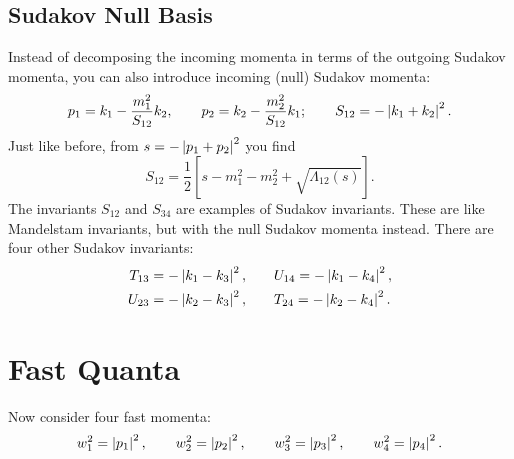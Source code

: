\subsection{Sudakov Null Basis}
Instead of decomposing the incoming momenta in terms of the outgoing Sudakov momenta, you can also introduce incoming (null) Sudakov momenta:
\begin{equation}
	p_{1} = k_{1} - \frac{m_{1}^{2}}{S_{12}} k_{2}, \qquad p_{2} = k_{2} - \frac{m_{2}^{2}}{S_{12}} k_{1}; \qquad S_{12} = -\left\lvert k_{1} + k_{2} \right\rvert^{2}.
\end{equation}
Just like before, from $s = -\left\lvert p_{1} + p_{2} \right\rvert^{2}$ you find
\begin{equation}
	S_{12} = \frac{1}{2} \left[ s - m_{1}^{2} - m_{2}^{2} + \sqrt{\Lambda_{12}(s)} \right].
\end{equation}
The invariants $S_{12}$ and $S_{34}$ are examples of Sudakov invariants. These are like Mandelstam invariants, but with the null Sudakov momenta instead. There are four other Sudakov invariants:
\begin{equation}
\begin{split}
	T_{13} = - \left\lvert k_{1} - k_{3} \right\rvert^{2}, &\qquad U_{14} = - \left\lvert k_{1} - k_{4} \right\rvert^{2}, \\
	U_{23} = - \left\lvert k_{2} - k_{3} \right\rvert^{2}, &\qquad T_{24} = - \left\lvert k_{2} - k_{4} \right\rvert^{2}.
\end{split}
\end{equation}
\section{Fast Quanta}
Now consider four fast momenta:
\begin{equation}
	w_{1}^{2} = \left\lvert p_{1} \right\rvert^{2}, \qquad w_{2}^{2} = \left\lvert p_{2} \right\rvert^{2}, \qquad w_{3}^{2} = \left\lvert p_{3} \right\rvert^{2}, \qquad w_{4}^{2} = \left\lvert p_{4} \right\rvert^{2}.
\end{equation}
